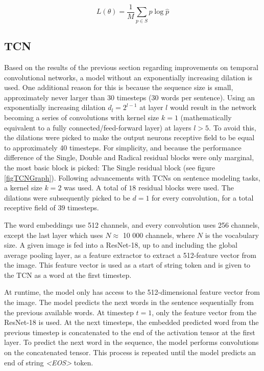 \documentclass[a4paper, twoside]{article}
\begin{document}
\begin{equation}
L(\theta) = \frac{1}{M} \sum_{p \in S} p \log{\hat{p}}
\end{equation}

\subsection{TCN}
Based on the results of the previous section regarding improvements on temporal convolutional networks, a model without an exponentially increasing dilation is used. One additional reason for this is because the sequence size is small, approximately never larger than 30 timesteps (30 words per sentence). Using an exponentially increasing dilation $d_l = 2^{l-1}$ at layer $l$ would result in the network becoming a series of convolutions with kernel size $k=1$ (mathematically equivalent to a fully connected/feed-forward layer) at layers $l>5$. To avoid this, the dilations were picked to make the output neurons receptive field to be equal to approximately 40 timesteps. For simplicity, and because the performance difference of the Single, Double and Radical residual blocks were only marginal, the most basic block is picked: The Single residual block (see figure \ref{figTCNGraph}). 
Following \cite{tcn} advancements with TCNs on sentence modeling tasks, a kernel size $k=2$ was used. A total of $18$ residual blocks were used. The dilations were subsequently picked to be $d=1$ for every convolution, for a total receptive field of $39$ timesteps.

The word embeddings use 512 channels, and every convolution uses 256 channels, except the last layer which uses $N \approx $ 10 000 channels, where $N$ is the vocabulary size. A given image is fed into a ResNet-18, up to and including the global average pooling layer, as a feature extractor to extract a 512-feature vector from the image. This feature vector is used as a start of string token and is given to the TCN as a word at the first timestep.

At runtime, the model only has access to the 512-dimensional feature vector from the image. The model predicts the next words in the sentence sequentially from the previous available words. At timestep $t=1$, only the feature vector from the ResNet-18 is used. At the next timesteps, the embedded predicted word from the previous timestep is concatenated to the end of the activation tensor at the first layer. To predict the next word in the sequence, the model performs convolutions on the concatenated tensor. This process is repeated until the model predicts an end of string \textit{<EOS>} token.
\end{document}
